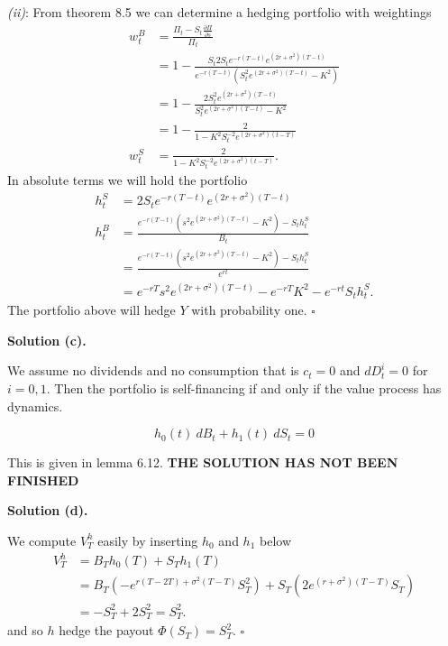 \documentclass[a4paper,12pt,openany]{book}
\begin{document}
\emph{(ii)}: From theorem 8.5 we can determine a hedging portfolio with weightings
\begin{align*}
w_t^B&=\frac{\Pi_t-S_t\frac{\partial\Pi}{\partial s}}{\Pi_t}\\
&=1-\frac{S_t2S_te^{-r(T-t)}e^{(2r+\sigma^2)(T-t)}}{e^{-r(T-t)}\left(S_t^2e^{(2r+\sigma^2)(T-t)}-K^2\right)}\\
&=1-\frac{2S_t^2e^{(2r+\sigma^2)(T-t)}}{S_t^2e^{(2r+\sigma^2)(T-t)}-K^2}\\
&=1-\frac{2}{1-K^2S_t^{-2}e^{(2r+\sigma^2)(t-T)}}\\
w_t^S&=\frac{2}{1-K^2S_t^{-2}e^{(2r+\sigma^2)(t-T)}}.
\end{align*}
In absolute terms we will hold the portfolio
\begin{align*}
h_t^S&=2S_te^{-r(T-t)}e^{(2r+\sigma^2)(T-t)}\\
h_t^B&=\frac{e^{-r(T-t)}\left(s^2e^{(2r+\sigma^2)(T-t)}-K^2\right)-S_th_t^S}{B_t}\\
&=\frac{e^{-r(T-t)}\left(s^2e^{(2r+\sigma^2)(T-t)}-K^2\right)-S_th_t^S}{e^{rt}}\\
&=e^{-rT}s^2e^{(2r+\sigma^2)(T-t)}-e^{-rT}K^2-e^{-rt}S_th_t^S.
\end{align*}
The portfolio above will hedge \(Y\) with probability one. \(\square\)

\noindent\makebox[\linewidth]{\rule{\textwidth}{0.4pt}}

\textbf{Solution (c).}

We assume no dividends and no consumption that is \(c_t=0\) and \(dD_t^i=0\) for \(i=0,1\). Then the portfolio is self-financing if and only if the value process has dynamics.

\[
h_0(t)\ dB_t+h_1(t)\ dS_t=0
\]

This is given in lemma 6.12. \textbf{THE SOLUTION HAS NOT BEEN FINISHED}

\noindent\makebox[\linewidth]{\rule{\textwidth}{0.4pt}}

\textbf{Solution (d).}

We compute \(V_T^h\) easily by inserting \(h_0\) and \(h_1\) below
\begin{align*}
V_T^h&=B_Th_0(T)+S_Th_1(T)\\
&=B_T\left(-e^{r(T-2T)+\sigma^2(T-T)}S_T^2\right)+S_T\left(2e^{(r+\sigma^2)(T-T)}S_T\right)\\
&=-S_T^2+2S_T^2=S_T^2.
\end{align*}
and so \(h\) hedge the payout \(\Phi(S_T)=S_T^2\). \(\square\)
\end{document}
